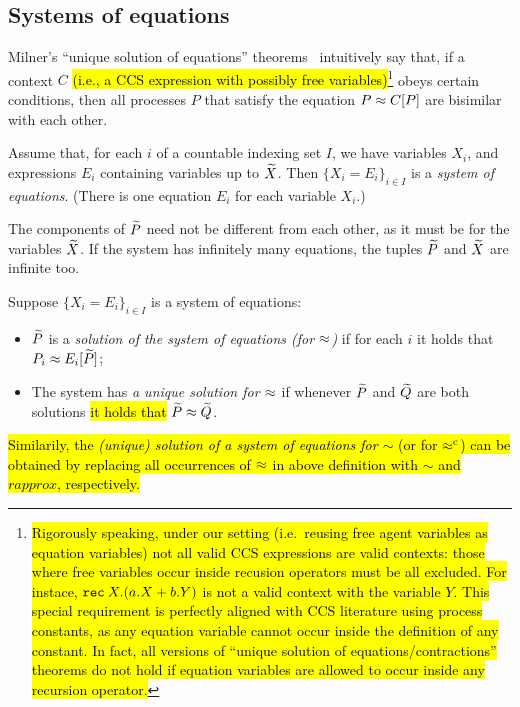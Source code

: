 \subsection{Systems of equations}
\label{ss:SysEq}

Milner's ``unique solution of equations'' theorems~\cite{Mil89} intuitively
say that, if a context $C$ \hl{(i.e., a CCS expression with possibly
free variables)}\footnote{\hl{Rigorously speaking, under our setting
(i.e.~reusing free agent variables as equation variables) not all
valid CCS expressions
are valid contexts: those where free variables occur inside
recusion operators must be all excluded. For instace, ${\tt rec}\: X . (a.X +
b.Y)$ is not a valid context with the variable $Y$. This special requirement
is perfectly aligned with CCS literature using process constants, as any
equation variable cannot occur inside the definition of any
constant. In fact, all versions of ``unique solution of
equations/contractions'' theorems do not hold if equation variables
are allowed to occur inside any recursion operator.}} obeys certain conditions,
then all processes $P$ that satisfy the equation $P \approx C [P]$ are
bisimilar with each other.

\begin{definition}[equations] %
  \label{def:equation}
Assume that, for each $i$ of 
 a countable indexing set $I$, we have variables $X_i$, and expressions
$E_i$ containing variables up to $\widetilde X$. Then 
$\{ X_i = E_i\}_{i\in I}$ is 
  a \emph{system of equations}. (There is one equation $E_i$ for each variable $X_i$.)
\end{definition}

The components of $\widetilde P$ need not be
different from each other, as it must be for the variables $\widetilde X$.
If the system has infinitely many equations, the  tuples $\widetilde P$ and $\widetilde X$ are infinite too.

\begin{definition}
  \label{def:solution}
Suppose $\{ X_i = E_i\}_{i\in I}$ is a system of equations: 
\begin{itemize}
\item
 $\widetilde P$ is a \emph{solution of the system of equations (for $\approx$)} 
if for each $i$ it holds that $P_i \approx E_i [\widetilde P]$;
\item The system has \emph{a unique solution for $\approx$}  if whenever 
 $\widetilde P$ and $\widetilde Q$ are both solutions \hl{it holds that} $\widetilde P \approx \widetilde Q$. 
\end{itemize} 
 \end{definition}
\hl{Similarily, the \emph{(unique) solution of a system of equations for $\sim$}
(or for $\mathrel{\approx^{\rm{c}}}$) can be obtained by replacing all occurrences of $\approx$
in above definition with $\sim$ and $rapprox$, respectively.}

